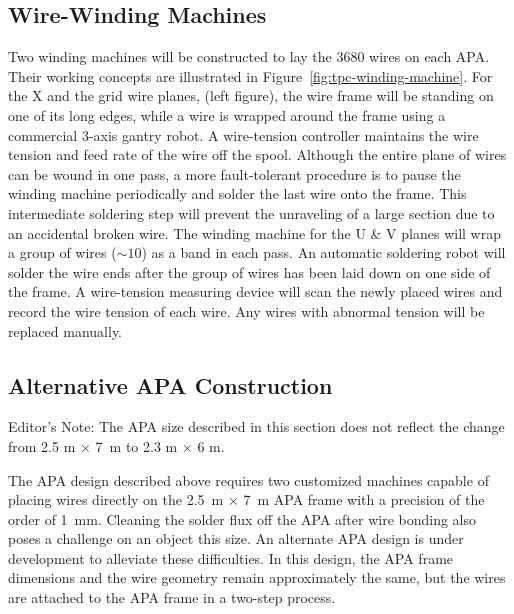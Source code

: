\subsection{Wire-Winding Machines}

Two winding machines will be constructed to lay the 3680 wires on each APA. 
Their working concepts are illustrated in Figure~\ref{fig:tpc-winding-machine}. 
For the X and the grid wire planes, (left figure), the wire frame will be standing on 
one of its long edges, while a wire is wrapped around the frame using a commercial
3-axis gantry robot. A wire-tension controller maintains the wire 
tension and feed rate of the wire off the spool. Although the entire plane of 
wires can be wound in one pass, a more fault-tolerant procedure is to 
pause the winding machine periodically and solder the last wire onto the frame.
This intermediate soldering step will prevent the unraveling of a large section 
due to an accidental broken wire.  
The winding machine for the U \& V planes will wrap a group of wires ($\sim 10$) as a band in each pass.
An automatic soldering robot will solder the wire ends after the group of wires has been laid down on one side of the frame. 
A wire-tension measuring device will scan the newly placed wires and record 
the wire tension of each wire. Any wires with abnormal tension will be 
replaced manually.  

\subsection{Alternative APA Construction}

\begin{editornote}
  Editor's Note:  The APA size described in this section does not reflect the change from 2.5 m $\times$ 7~m  to 2.3 m $\times$ 6 m.
\end{editornote}

The APA design described above requires two customized machines capable of placing wires directly on the 2.5~m $\times$ 7~m APA frame with a precision of the order of 1~mm.  Cleaning the solder flux off the APA after wire bonding also poses a challenge on an object this size. An alternate APA design is under development to alleviate these difficulties.  In this design, the APA frame dimensions and the wire geometry remain  approximately the same, but the wires are attached to the APA frame in a two-step process.

